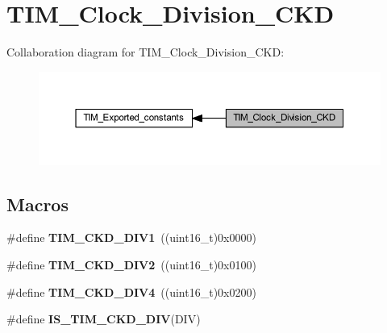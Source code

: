\hypertarget{group___t_i_m___clock___division___c_k_d}{}\section{T\+I\+M\+\_\+\+Clock\+\_\+\+Division\+\_\+\+C\+KD}
\label{group___t_i_m___clock___division___c_k_d}
Collaboration diagram for T\+I\+M\+\_\+\+Clock\+\_\+\+Division\+\_\+\+C\+KD\+:
\nopagebreak
\begin{figure}[H]
\begin{center}
\leavevmode
\includegraphics[width=350pt]{group___t_i_m___clock___division___c_k_d}
\end{center}
\end{figure}
\subsection*{Macros}
\begin{DoxyCompactItemize}
\item 
\mbox{\label{group___t_i_m___clock___division___c_k_d_ga88691a07b3976791977d280045b3c850}} 
\#define {\bfseries T\+I\+M\+\_\+\+C\+K\+D\+\_\+\+D\+I\+V1}~((uint16\+\_\+t)0x0000)
\item 
\mbox{\label{group___t_i_m___clock___division___c_k_d_ga46a5fd6a173a7e88528a6e4084a08665}} 
\#define {\bfseries T\+I\+M\+\_\+\+C\+K\+D\+\_\+\+D\+I\+V2}~((uint16\+\_\+t)0x0100)
\item 
\mbox{\label{group___t_i_m___clock___division___c_k_d_gac2e5c030f964f9b4c92fa8129fb923bc}} 
\#define {\bfseries T\+I\+M\+\_\+\+C\+K\+D\+\_\+\+D\+I\+V4}~((uint16\+\_\+t)0x0200)
\item 
\#define {\bfseries I\+S\+\_\+\+T\+I\+M\+\_\+\+C\+K\+D\+\_\+\+D\+IV}(D\+IV)
\end{DoxyCompactItemize}


